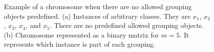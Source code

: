 \begin{figure}[!ht]
\begin{subfigure}{0.6\textwidth}
{\begin{circuitikz}
        
                \end{circuitikz}
            }%
            \caption{} 
            \label{fig:genome_2_example}
        \end{subfigure}
        \caption{Example of a chromosome when there are no allowed grouping objects predefined. (a) Instances of arbitrary classes. They are $x_1$, $x_2$, $x_3$, $x_4$, and $x_5$. There are no predefined allowed grouping objects. (b) Chromosome represented as a binary matrix for $m=5$. It represents which instance is part of each grouping.} 
        \label{fig:genome_2}
    \end{figure}